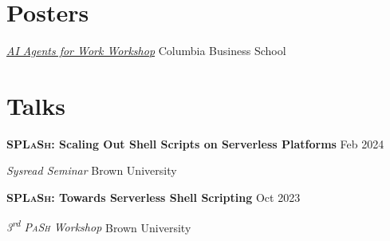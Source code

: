 \documentclass[margin,12pt]{resume}
\newcommand{\descriptionVSpace}{\vspace{0.5ex}\xspace}
\newcommand{\subsectionVSpace}{\vspace{3.5ex}\xspace}
\newcommand{\sectionVSpace}{\vspace{1ex}\xspace} %
\newcommand{\pash}{\textsc{PaSh}\xspace}
\newcommand{\sectionVSpaceCorrection}{\vspace{-3.5ex}} %
\newcommand{\splash}{\textsc{SPLaSh}\xspace}
\newcommand{\header}[1]{\textbf{#1}\xspace}
\newcommand{\competition}[1]{\header{#1}\xspace}
\newcommand{\event}[1]{\textit{#1}\xspace}
\newcommand{\ordinal}[1]{\textsuperscript{#1}\xspace}
\newcommand{\place}[1]{#1\xspace}
\newcommand{\singleDate}[1]{#1\xspace}
\newcommand{\talk}[1]{\header{#1}\xspace}
\newenvironment{rSubsection}{}{\par\subsectionVSpace}
\newenvironment{rSection}[1]{\sectionVSpaceCorrection\section{#1}\xspace}{\sectionVSpace\par}
\newenvironment{jobDuties}{\descriptionVSpace}{\par}
\begin{document}
\begin{resume}
\begin{rSection}{Posters}
\begin{rSubsection}
            \event{\href{https://daplab.cs.columbia.edu/workshop/}{AI Agents for Work Workshop}} \hfill \place{Columbia Business School}
        \end{rSubsection}
    \end{rSection}

    \begin{rSection}{Talks}


        \begin{rSubsection}
            \talk{\splash: Scaling Out Shell Scripts on Serverless Platforms} \hfill \singleDate{Feb 2024}

            \event{Sysread Seminar} \hfill \place{Brown University}
        \end{rSubsection}



        \begin{rSubsection}
            \talk{\splash: Towards Serverless Shell Scripting} \hfill \singleDate{Oct 2023}

            \event{3\ordinal{rd} \pash Workshop} \hfill \place{Brown University}
        \end{rSubsection}
    \end{rSection}




\end{resume}
\end{document}
